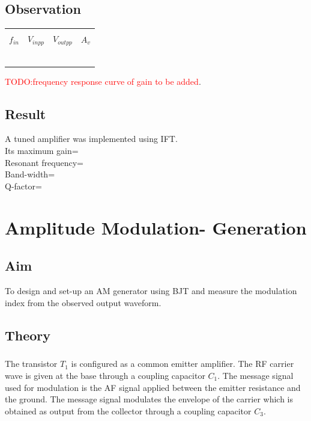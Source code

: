 \documentclass{book}
\begin{document}
\section*{Observation}
\begin{center}

\begin{tabular}{|l|l|l|l|}

\hline
 & & &\\
 
$f_{in}$  & $V_{inpp}$ & $V_{outpp}$ & $A_v$\\
 & & & \\ \hline
 & & &\\ \hline
& & &\\ \hline
& & &\\ \hline
& & &\\ \hline
& & &\\ \hline

\end{tabular}
\end{center}
\textcolor{red}{TODO:frequency response curve of gain to be added}. 
\section*{Result}
A tuned amplifier was implemented using IFT.\\
Its maximum gain= \\
Resonant frequency= \\
Band-width=\\
Q-factor= 

\chapter[Amplitude Modulation- Generation]{Amplitude Modulation- Generation}

\section*{Aim}
To design and set-up  an AM generator using BJT and measure the modulation index from the observed output waveform.

\section*{Theory}
\paragraph{}
	The transistor $T_1$ is configured as a common emitter amplifier. The RF carrier wave is given at the base through a coupling capacitor $C_1$.  The message signal used for modulation is the AF signal applied between the emitter resistance and the ground. The message signal modulates the envelope of the carrier which is obtained as output from the collector through a coupling capacitor $C_3$. 
\end{document}
